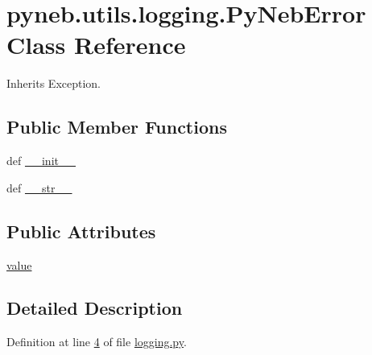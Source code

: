 \hypertarget{classpyneb_1_1utils_1_1logging_1_1_py_neb_error}{\section{pyneb.\-utils.\-logging.\-Py\-Neb\-Error Class Reference}
\label{classpyneb_1_1utils_1_1logging_1_1_py_neb_error}
}


Inherits Exception.

\subsection*{Public Member Functions}
\begin{DoxyCompactItemize}
\item 
def \hyperlink{classpyneb_1_1utils_1_1logging_1_1_py_neb_error_a453af04615a0375061725f7af800bfa5}{\-\_\-\-\_\-init\-\_\-\-\_\-}
\item 
def \hyperlink{classpyneb_1_1utils_1_1logging_1_1_py_neb_error_a5ceaa0ce6cdcba7dd93daae650b3458a}{\-\_\-\-\_\-str\-\_\-\-\_\-}
\end{DoxyCompactItemize}
\subsection*{Public Attributes}
\begin{DoxyCompactItemize}
\item 
\hyperlink{classpyneb_1_1utils_1_1logging_1_1_py_neb_error_aec64ebee7cc44f3c40b15959cfeb2efb}{value}
\end{DoxyCompactItemize}


\subsection{Detailed Description}


Definition at line \hyperlink{logging_8py_source_l00004}{4} of file \hyperlink{logging_8py_source}{logging.\-py}.




